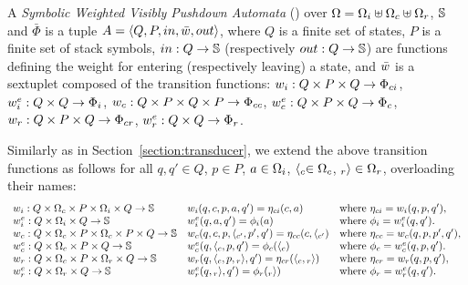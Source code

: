 \begin{definition}
A \emph{Symbolic Weighted Visibly Pushdown Automata} (\SWVPA) 
over  $\Omega = \Omegai \uplus \Omegac \uplus \Omegar$, $\mathbb{S}$ and $\bar\Phi$ 
is a tuple $A = \< Q, P, \init, \bar\wei, \final >$,
where $Q$ is a finite set of states, 
$P$ is a finite set of stack symbols, 
$\mathsf{in} : Q \to \Semiring$ 
(respectively $\mathsf{out} : Q \to \Semiring$)
are functions defining the weight for entering
(respectively leaving) a state, 
and $\bar\wei$ is a sextuplet composed of the transition functions:
$\weii : Q \times P \times Q \to \Phici$,  
$\weiei : Q \times Q \to \Phii$,  
$\weic : Q \times P \times Q \times P \to \Phicc$,  
$\weiec : Q \times P \times Q \to \Phic$,  
$\weir : Q \times P \times Q \to \Phicr$,  
$\weier : Q \times Q \to \Phir$.
\end{definition}
%
Similarly as in Section~\ref{section:transducer}, 
we extend the above transition functions as follows
for all $q, q' \in Q$, $p \in P$, 
$a \in \Omegai$, 
$\call{c} \in \Omegac$, 
$\return{r} \in \Omegar$, 
overloading their names: %
\[
\begin{array}{lll}
\weii: Q \times \Omegac \times P \times \Omegai \times Q \to \Semiring & 
\weii(q, c, p, a, q') = \eta_\mathsf{ci}(c, a) & 
\mathrm{where~} \eta_\mathsf{ci} = \weii(q, p, q'),\\
%
\weiei: Q \times \Omegai \times Q \to \Semiring & 
\weiei(q, a, q') = \phi_\mathsf{i}(a) &
\mathrm{where~} \phi_\mathsf{i} = \weiei(q, q').\\
%
\weic: Q \times \Omegac \times P \times  \Omegac \times P \times Q \to \Semiring & 
\weic(q, c, p, \call{c'}, p', q') = \eta_\mathsf{cc}(c, \call{c'}) & 
\mathrm{where~} \eta_\mathsf{cc} = \weic(q, p, p', q'),\\
%
\weiec: Q \times \Omegac \times P \times Q \to \Semiring & 
\weiec(q, {\call{c}}, p, q') = \phi_\mathsf{c}({\call{c}}) &
\mathrm{where~} \phi_\mathsf{c} = \weiec(q, p, q').\\
%
\weir: Q \times \Omegac \times P \times \Omegar \times Q \to \Semiring & 
\weir(q, {\call{c}},  p, {\return{r}}, q') = \eta_\mathsf{cr}({\call{c}},  {\return{r}}) & 
\mathrm{where~} \eta_\mathsf{cr} = \weir(q, p, q'),\\
%
\weier: Q \times \Omegar \times Q \to \Semiring & 
\weier(q, {\return{r}}, q') = \phi_\mathsf{r}({\return{r}}) &
\mathrm{where~} \phi_\mathsf{r} = \weier(q, q').\\
\end{array}      
\]

